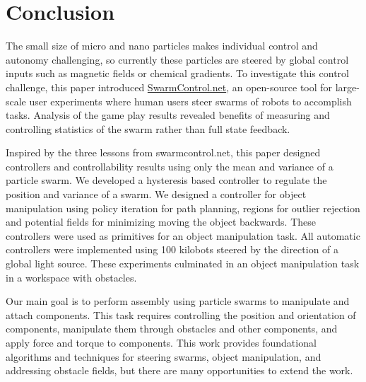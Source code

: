 \section{Conclusion}\label{sec:conclusion}
 
  The small size of micro and nano particles makes individual control and autonomy challenging, so currently these particles are steered by global control inputs such as magnetic fields or chemical gradients. To investigate this control challenge, this paper introduced \href{http://www.swarmcontrol.net}{SwarmControl.net}, an open-source tool for large-scale user experiments where human users steer swarms of robots to accomplish tasks.  Analysis of the game play results revealed benefits of measuring and controlling statistics of the swarm rather than full state feedback.

Inspired by the three lessons from swarmcontrol.net, this paper designed controllers and controllability results using only the mean and variance of a particle swarm. 
We developed a hysteresis based controller to regulate the position and variance of a swarm. We designed a controller for object manipulation using policy iteration for path planning, regions for outlier rejection and potential fields for minimizing moving the object backwards. These controllers were used as primitives for an object manipulation task.
All automatic controllers were implemented using 100 kilobots steered by the direction of a global light source.
These experiments culminated in an object manipulation task in a workspace with obstacles.
    


Our main goal is to perform assembly using particle swarms to manipulate and attach components. This task requires controlling the position and orientation of components, manipulate them through obstacles and other components, and apply force and torque to components. This work provides foundational algorithms and techniques for steering swarms, object manipulation, and addressing obstacle fields, but there are many opportunities to extend the work.

